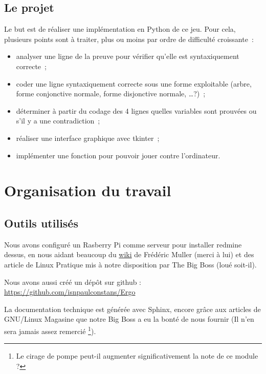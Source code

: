 \documentclass[12pt, algo]{cours}
\begin{document}
\subsection{Le projet}

Le but est de réaliser une implémentation en Python de ce jeu. Pour cela, plusieurs points sont à traiter, plus ou moins par ordre de difficulté croissante~:
\nopagebreak
\begin{itemize}
\item analyser une ligne de la preuve pour vérifier qu'elle est syntaxiquement correcte~;
\item coder une ligne syntaxiquement correcte sous une forme exploitable (arbre, forme conjonctive normale, forme disjonctive normale, \dots ?)~;
\item déterminer à partir du codage des 4 lignes quelles variables sont prouvées ou s'il y a une contradiction~;
\item réaliser une interface graphique avec tkinter~;
\item implémenter une fonction pour pouvoir jouer contre l'ordinateur.
\end{itemize}



\section{Organisation du travail}

\subsection{Outils utilisés}

Nous avons configuré un Rasberry Pi comme serveur pour installer redmine dessus, en nous aidant beaucoup du \href{http://juramaths.fr/redmine/projects/serveur-web-sur-un-raspberry-pi/wiki}{wiki} de Frédéric Muller (merci à lui) et des article de Linux Pratique mis à notre disposition par The Big Boss (loué soit-il).

Nous avons aussi créé un dépôt sur github : \url{https://github.com/isnpaulconstans/Ergo}

La documentation technique est générée avec Sphinx, encore grâce aux articles de GNU/Linux Magasine que notre Big Boss a eu la bonté de nous fournir (Il n'en sera jamais assez remercié \footnote{Le cirage de pompe peut-il augmenter significativement la note de ce module ?}).
\end{document}
